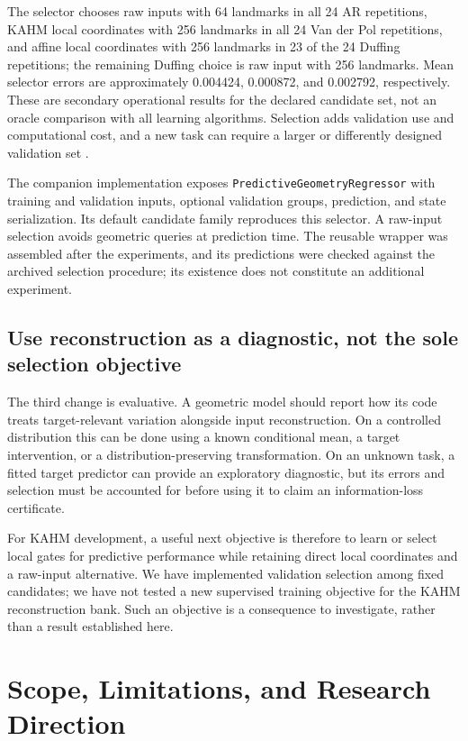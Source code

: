 \documentclass[10pt]{article}
\begin{document}
The selector chooses raw inputs with 64 landmarks in all 24 AR repetitions,
KAHM local coordinates with 256 landmarks in all 24 Van der Pol repetitions,
and affine local coordinates with 256 landmarks in 23 of the 24 Duffing
repetitions; the remaining Duffing choice is raw input with 256 landmarks.
Mean selector errors are approximately 0.004424, 0.000872, and 0.002792,
respectively. These are secondary operational results for the declared
candidate set, not an oracle comparison with all learning algorithms.
Selection adds validation use and computational cost, and a new task can
require a larger or differently designed validation set
\citep{Cawley2010Selection}.

The companion implementation exposes \texttt{PredictiveGeometryRegressor}
with training and validation inputs, optional validation groups, prediction,
and state serialization. Its default candidate family reproduces this
selector. A raw-input selection avoids geometric queries at prediction
time. The reusable wrapper was assembled after the experiments, and its
predictions were checked against the archived selection procedure; its
existence does not constitute an additional experiment.

\subsection{Use reconstruction as a diagnostic, not the sole selection objective}

The third change is evaluative. A geometric model should report how its
code treats target-relevant variation alongside input reconstruction.
On a controlled distribution this can be done using a known conditional
mean, a target intervention, or a distribution-preserving transformation.
On an unknown task, a fitted target predictor can provide an exploratory
diagnostic, but its errors and selection must be accounted for before
using it to claim an information-loss certificate.

For KAHM development, a useful next objective is therefore to learn or
select local gates for predictive performance while retaining direct local
coordinates and a raw-input alternative. We have implemented validation
selection among fixed candidates; we have not tested a new supervised
training objective for the KAHM reconstruction bank. Such an objective is
a consequence to investigate, rather than a result established here.

\section{Scope, Limitations, and Research Direction}\label{sec:limits}
\end{document}
